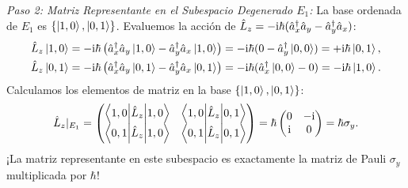 \begin{ejemplobox}
    \textit{Paso 2: Matriz Representante en el Subespacio Degenerado $E_1$:}
    La base ordenada de $E_1$ es $\{\left| 1, 0 \right\rangle, \left| 0, 1 \right\rangle\}$. Evaluemos la acción de $\hat{L}_z = -\mathrm{i}\hbar(\hat{a}_x^\dagger\hat{a}_y - \hat{a}_y^\dagger\hat{a}_x)$:
    \begin{align}
        \hat{L}_z\left| 1, 0 \right\rangle &= -\mathrm{i}\hbar\left( \hat{a}_x^\dagger\hat{a}_y\left| 1, 0 \right\rangle - \hat{a}_y^\dagger\hat{a}_x\left| 1, 0 \right\rangle \right) = -\mathrm{i}\hbar(0 - \hat{a}_y^\dagger\left| 0, 0 \right\rangle) = +\mathrm{i}\hbar\left| 0, 1 \right\rangle, \\
        \hat{L}_z\left| 0, 1 \right\rangle &= -\mathrm{i}\hbar\left( \hat{a}_x^\dagger\hat{a}_y\left| 0, 1 \right\rangle - \hat{a}_y^\dagger\hat{a}_x\left| 0, 1 \right\rangle \right) = -\mathrm{i}\hbar(\hat{a}_x^\dagger\left| 0, 0 \right\rangle - 0) = -\mathrm{i}\hbar\left| 1, 0 \right\rangle.
    \end{align}
    Calculamos los elementos de matriz en la base $\{\left| 1, 0 \right\rangle, \left| 0, 1 \right\rangle\}$:
    \begin{equation}
        \hat{L}_z|_{E_1} = \begin{pmatrix}
            \left\langle 1, 0 \middle| \hat{L}_z \middle| 1, 0 \right\rangle & \left\langle 1, 0 \middle| \hat{L}_z \middle| 0, 1 \right\rangle \\
            \left\langle 0, 1 \middle| \hat{L}_z \middle| 1, 0 \right\rangle & \left\langle 0, 1 \middle| \hat{L}_z \middle| 0, 1 \right\rangle
        \end{pmatrix} = \hbar \begin{pmatrix} 0 & -\mathrm{i} \\ \mathrm{i} & 0 \end{pmatrix} = \hbar\sigma_y.
    \end{equation}
    ¡La matriz representante en este subespacio es exactamente la matriz de Pauli $\sigma_y$ multiplicada por $\hbar$!


\end{ejemplobox}
